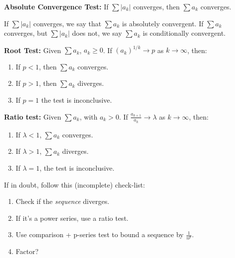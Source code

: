 \documentclass{article}
\begin{document}
    \begin{theorem}
        \textbf{Absolute Convergence Test:} If $\sum |a_k|$ converges, then $\sum a_k$ converges.
        \vspace{2mm}

        If $\sum |a_k|$ converges, we say that $\sum a_{k}$ is absolutely convergent. If $\sum a_k$ converges, but $\sum |a_k|$ does not, we say $\sum a_k$ is conditionally convergent.
    \end{theorem}
    \begin{theorem}
        \textbf{Root Test:} Given $\sum a_k$, $a_k \ge 0$. If $(a_k)^{1/k} \to p$ as $k\to\infty$, then:
        \begin{enumerate}
            \item If $p<1$, then $\sum a_k$ converges.
            \item If $p>1$, then $\sum a_k$ diverges.
            \item If $p=1$ the test is inconclusive.
        \end{enumerate}
    \end{theorem}
    \begin{theorem}
        \textbf{Ratio test:} Given $\sum a_k$, with $a_k>0$. If $\frac{a_{k+1}}{a_k}\to \lambda$ as $k\to\infty$, then:
        \begin{enumerate}
            \item If $\lambda < 1$, $\sum a_k$ converges.
            \item If $\lambda >1$, $\sum a_k$ diverges.
            \item If $\lambda = 1$, the test is inconclusive.
        \end{enumerate}
    \end{theorem}
    If in doubt, follow this (incomplete) check-list:
    \begin{enumerate}
        \item Check if the \textit{sequence} diverges.
        \item If it's a power series, use a ratio test.
        \item Use comparison + p-series test to bound a sequence by $\frac{1}{n^p}$.
        \item Factor?
    \end{enumerate}
\end{document}
